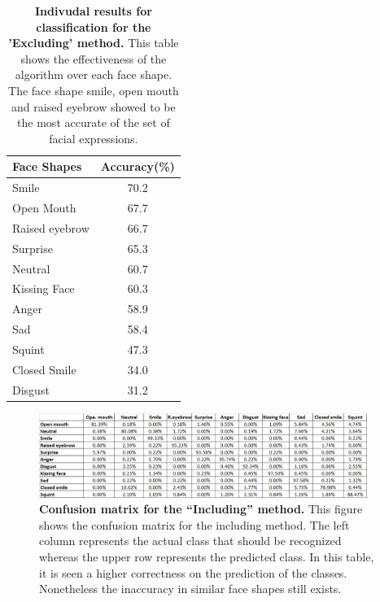 \documentclass[]{article}
\begin{document}
\begin{table}[t]
\centering
\begin{tabular}{|l|c|}
\hline
Face Shapes & Accuracy(\%) \\ \hline
Smile & 70.2\\ \hline
Open Mouth & 67.7\\\hline
Raised eyebrow & 66.7\\\hline
Surprise & 65.3\\\hline
Neutral & 60.7\\\hline
Kissing Face & 60.3\\\hline
Anger & 58.9\\\hline
Sad & 58.4\\\hline
Squint & 47.3\\\hline
Closed Smile & 34.0\\\hline
Disgust & 31.2\\\hline
\end{tabular}
\caption{\textbf{Indivudal results for classification for the 'Excluding'
method.} This table shows the effectiveness of the algorithm over each face
shape. The face shape smile, open mouth and raised eyebrow showed to be the
most accurate of the set of facial expressions.}
\label{rankEx}
\end{table}




\begin{figure}[ht]
\begin{center}
\vspace{-3mm}
\includegraphics[width=0.95\textwidth]{figures/confusionIncluding.jpg}
\end{center}
\caption{\textbf{Confusion matrix for the ``Including'' method.} This figure 
shows the confusion matrix for the including method. The left column represents 
the actual class that should be recognized whereas the upper row represents the 
predicted class. In this table, it is seen a higher correctness on the
prediction  of the classes. Nonetheless the inaccuracy in similar face shapes
still exists.}
\label{coIncluding}
\end{figure}
\end{document}
